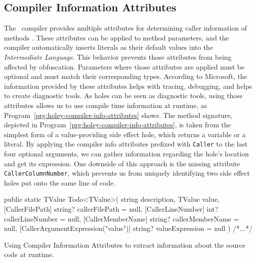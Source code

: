 \subsection{Compiler Information Attributes}
\label{sec:holey-compiler-info-attributes}
The \CS\ compiler provides multiple attributes for determining caller information of methods \cite{microsoft_attributes_2022}.
These attributes can be applied to method parameters, and the compiler automatically inserts literals as their default values into the \emph{Intermediate Language}.
This behavior prevents those attributes from being affected by obfuscation.
Parameters where those attributes are applied must be optional and must match their corresponding types.
According to Microsoft, the information provided by these attributes helps with tracing, debugging, and helps to create diagnostic tools.
As holes can be seen as diagnostic tools, using those attributes allows us to use compile time information at runtime, as Program~\ref{prg:holey-compiler-info-attributes} shows.
The method signature, depicted in Program~\ref{prg:holey-compiler-info-attributes}, is taken from the simplest form of a value-providing side effect hole, which returns a variable or a literal.
By applying the compiler info attributes prefixed with \verb|Caller| to the last four optional arguments, we can gather information regarding the hole's location and get its expression.
One downside of this approach is the missing attribute \verb|CallerColumnNumber|, which prevents us from uniquely identifying two side effect holes put onto the same line of code.

\begin{program}[ht]
\begin{CsCode}
public static TValue Todo<TValue>(
	string description,
	TValue value,
	[CallerFilePath] string? callerFilePath = null,
	[CallerLineNumber] int? callerLineNumber = null,
	[CallerMemberName] string? callerMemberName = null,
	[CallerArgumentExpression("value")] string? valueExpression = null
) { /*...*/ }
\end{CsCode}
\caption{Using Compiler Information Attributes to extract information about the source code at runtime.}
\label{prg:holey-compiler-info-attributes}
\end{program}

